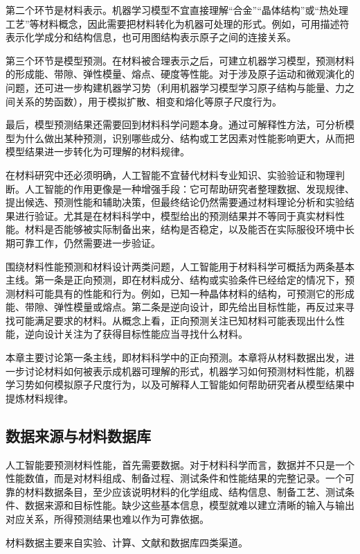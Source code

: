 第二个环节是材料表示。机器学习模型不宜直接理解“合金”“晶体结构”或“热处理工艺”等材料概念，因此需要把材料转化为机器可处理的形式。例如，可用描述符表示化学成分和结构信息，也可用图结构表示原子之间的连接关系。

第三个环节是模型预测。在材料被合理表示之后，可建立机器学习模型，预测材料的形成能、带隙、弹性模量、熔点、硬度等性能。对于涉及原子运动和微观演化的问题，还可进一步构建机器学习势（利用机器学习模型学习原子结构与能量、力之间关系的势函数），用于模拟扩散、相变和熔化等原子尺度行为。

最后，模型预测结果还需要回到材料科学问题本身。通过可解释性方法，可分析模型为什么做出某种预测，识别哪些成分、结构或工艺因素对性能影响更大，从而把模型结果进一步转化为可理解的材料规律。


在材料研究中还必须明确，人工智能不宜替代材料专业知识、实验验证和物理判断。人工智能的作用更像是一种增强手段：它可帮助研究者整理数据、发现规律、提出候选、预测性能和辅助决策，但最终结论仍然需要通过材料理论分析和实验结果进行验证。尤其是在材料科学中，模型给出的预测结果并不等同于真实材料性能。材料是否能够被实际制备出来，结构是否稳定，以及能否在实际服役环境中长期可靠工作，仍然需要进一步验证。


围绕材料性能预测和材料设计两类问题，人工智能用于材料科学可概括为两条基本主线。第一条是正向预测，即在材料成分、结构或实验条件已经给定的情况下，预测材料可能具有的性能和行为。例如，已知一种晶体材料的结构，可预测它的形成能、带隙、弹性模量或熔点。第二条是逆向设计，即先给出目标性能，再反过来寻找可能满足要求的材料。从概念上看，正向预测关注已知材料可能表现出什么性能，逆向设计关注为了获得目标性能应当寻找什么材料。


本章主要讨论第一条主线，即材料科学中的正向预测。本章将从材料数据出发，进一步讨论材料如何被表示成机器可理解的形式，机器学习如何预测材料性能，机器学习势如何模拟原子尺度行为，以及可解释人工智能如何帮助研究者从模型结果中提炼材料规律。


\subsection{数据来源与材料数据库}

人工智能要预测材料性能，首先需要数据。对于材料科学而言，数据并不只是一个性能数值，而是对材料组成、制备过程、测试条件和性能结果的完整记录。一个可靠的材料数据条目，至少应该说明材料的化学组成、结构信息、制备工艺、测试条件、数据来源和目标性能。缺少这些基本信息，模型就难以建立清晰的输入与输出对应关系，所得预测结果也难以作为可靠依据。


材料数据主要来自实验、计算、文献和数据库四类渠道。


